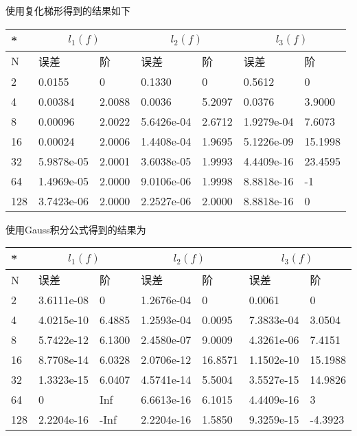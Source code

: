 \documentclass{article}
\begin{document}
	使用复化梯形得到的结果如下
	
	\begin{table}[H]
		\centering
		\begin{tabular}{|l|l|l|l|l|l|l|}
			\hline
			* &
			 \multicolumn{2}{c|}{$l_1(f)$} &
			 \multicolumn{2}{c|}{$l_2(f)$} &
			 \multicolumn{2}{c|}{$l_3(f)$}  \\   \hline
			
			
			N & 误差 & 阶 & 误差 & 阶 & 误差 & 阶 \\ \hline
			2 & 0.0155 & 0  & 0.1330 & 0  & 0.5612 & 0  \\ \hline
			4 & 0.00384 & 2.0088 & 0.0036 & 5.2097 & 0.0376 & 3.9000 \\ \hline
			8 & 0.00096 & 2.0022 & 5.6426e-04 & 2.6712 & 1.9279e-04 & 7.6073 \\ \hline
			16 & 0.00024 & 2.0006 & 1.4408e-04 & 1.9695 & 5.1226e-09  & 15.1998 \\ \hline
			32 & 5.9878e-05  & 2.0001 & 3.6038e-05  & 1.9993 & 4.4409e-16  & 23.4595 \\ \hline
			64 & 1.4969e-05  & 2.0000 & 9.0106e-06  & 1.9998 & 8.8818e-16  & -1  \\ \hline
			128 & 3.7423e-06 & 2.0000 & 2.2527e-06 & 2.0000 & 8.8818e-16 & 0 \\ \hline
		\end{tabular}
	\end{table}

    使用Gauss积分公式得到的结果为
	
	\begin{table}[H]
		\centering
		\begin{tabular}{|l|l|l|l|l|l|l|}
			\hline
			
			* &
			\multicolumn{2}{c|}{$l_1(f)$} &
			\multicolumn{2}{c|}{$l_2(f)$} &
			\multicolumn{2}{c|}{$l_3(f)$}  \\   \hline
			
			
			N & 误差 & 阶 & 误差 & 阶 & 误差 & 阶 \\ \hline
		 2 & 3.6111e-08  & 0  & 1.2676e-04 & 0  & 0.0061 & 0  \\ \hline
		4 & 4.0215e-10  & 6.4885 & 1.2593e-04 & 0.0095 & 7.3833e-04 & 3.0504 \\ \hline
		8 & 5.7422e-12  & 6.1300 & 2.4580e-07  & 9.0009 & 4.3261e-06  & 7.4151 \\ \hline
		16 & 8.7708e-14  & 6.0328 & 2.0706e-12  & 16.8571 & 1.1502e-10  & 15.1988 \\ \hline
		32 & 1.3323e-15  & 6.0407 & 4.5741e-14  & 5.5004 & 3.5527e-15  & 14.9826 \\ \hline
		64 & 0  & Inf  & 6.6613e-16  & 6.1015 & 4.4409e-16  & 3  \\ \hline
		128 & 2.2204e-16 & -Inf & 2.2204e-16 & 1.5850 & 9.3259e-15 & -4.3923 \\ \hline
		\end{tabular}
	\end{table}
\end{document}
